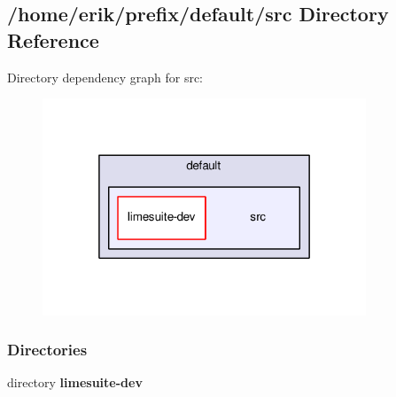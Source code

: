 \subsection{/home/erik/prefix/default/src Directory Reference}
\label{dir_b4804201d5ae79dd9b765c673f6732d6}
Directory dependency graph for src\+:
\nopagebreak
\begin{figure}[H]
\begin{center}
\leavevmode
\includegraphics[width=274pt]{dir_b4804201d5ae79dd9b765c673f6732d6_dep}
\end{center}
\end{figure}
\subsubsection*{Directories}
\begin{DoxyCompactItemize}
\item 
directory {\bf limesuite-\/dev}
\end{DoxyCompactItemize}
